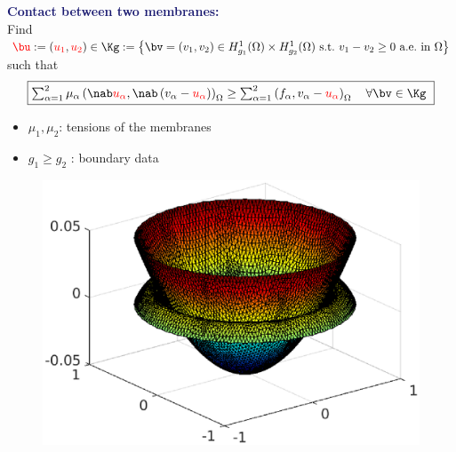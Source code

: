 \begin{frame}
\textcolor{midnightblue}{\textbf{Contact between two membranes:}}
\\
\vspace*{0.1 cm}
Find $\textcolor{red}{\bu}:=(\textcolor{red}{u_1},\textcolor{red}{u_2}) \in \Kg := \left\{ \bv = \left(v_1,v_2\right) \in H_{g_1}^1(\Omega) \times H_{g_2}^1(\Omega) \ \text{s.t.} \ v_1 - v_2 \geq 0  \ \text{a.e.} \ \text{in} \ \Omega \right\}$ such that
 \begin{equation*}
  \fbox{$ \sum_{\alpha=1}^2 \mu_{\alpha}
   \left( \nab \textcolor{red}{u_{\alpha}}, \nab \left(v_{\alpha} - \textcolor{red}{u_{\alpha}} \right) \right)_{\Omega} \geq
   \sum_{\alpha=1}^2 \left(f_{\alpha}, v_{\alpha} - \textcolor{red}{u_{\alpha}} \right)_{\Omega} \quad \forall \bv \in \Kg$ }
 \end{equation*}
 \begin{minipage}{0.37 \linewidth}
 \begin{itemize}
 \item $\mu_1, \mu_2$: tensions of the membranes
   \item $g_1 \geq g_2$ : boundary data
\end{itemize} 
 \end{minipage}
 \hfill
 \begin{minipage}{0.55 \linewidth}
\begin{figure}
\includegraphics[scale = 0.5]{fig_article_chap_1/fig_membrane_cv.eps}    
\end{figure}
\end{minipage}

 \end{frame}

